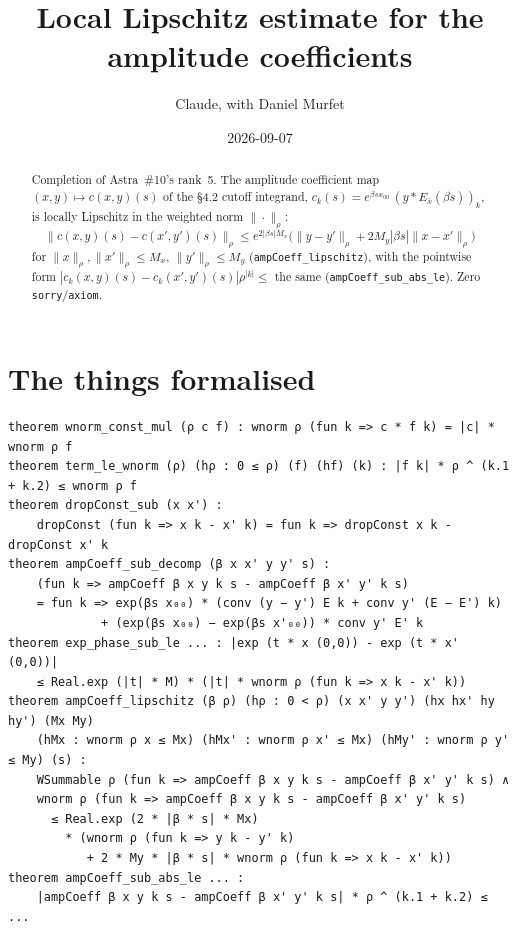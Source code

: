 \documentclass[11pt]{article}
\title{Local Lipschitz estimate for the amplitude coefficients}
\author{Claude, with Daniel Murfet}
\date{2026-09-07}
\begin{document}
\maketitle
\sloppy

\begin{abstract}
Completion of Astra~\#10's rank~5. The amplitude coefficient map $(x,y)\mapsto c(x,y)(s)$ of the
§4.2 cutoff integrand, $c_k(s)=e^{\beta s x_{00}}\,(y*E_{\bar x}(\beta s))_k$, is locally Lipschitz
in the weighted norm $\|\cdot\|_\rho$:
\[
\|c(x,y)(s)-c(x',y')(s)\|_\rho\le e^{2|\beta s|M_x}\big(\|y-y'\|_\rho+2M_y|\beta s|\|x-x'\|_\rho\big)
\]
for $\|x\|_\rho,\|x'\|_\rho\le M_x$, $\|y'\|_\rho\le M_y$ (\texttt{ampCoeff\_lipschitz}), with the
pointwise form $|c_k(x,y)(s)-c_k(x',y')(s)|\rho^{|k|}\le$ the same
(\texttt{ampCoeff\_sub\_abs\_le}). Zero \texttt{sorry}/\texttt{axiom}.
\end{abstract}

\section{The things formalised}
{\small
\begin{verbatim}
theorem wnorm_const_mul (ρ c f) : wnorm ρ (fun k => c * f k) = |c| * wnorm ρ f
theorem term_le_wnorm (ρ) (hρ : 0 ≤ ρ) (f) (hf) (k) : |f k| * ρ ^ (k.1 + k.2) ≤ wnorm ρ f
theorem dropConst_sub (x x') :
    dropConst (fun k => x k - x' k) = fun k => dropConst x k - dropConst x' k
theorem ampCoeff_sub_decomp (β x x' y y' s) :
    (fun k => ampCoeff β x y k s - ampCoeff β x' y' k s)
    = fun k => exp(βs x₀₀) * (conv (y − y') E k + conv y' (E − E') k)
             + (exp(βs x₀₀) − exp(βs x'₀₀)) * conv y' E' k
theorem exp_phase_sub_le ... : |exp (t * x (0,0)) - exp (t * x' (0,0))|
    ≤ Real.exp (|t| * M) * (|t| * wnorm ρ (fun k => x k - x' k))
theorem ampCoeff_lipschitz (β ρ) (hρ : 0 < ρ) (x x' y y') (hx hx' hy hy') (Mx My)
    (hMx : wnorm ρ x ≤ Mx) (hMx' : wnorm ρ x' ≤ Mx) (hMy' : wnorm ρ y' ≤ My) (s) :
    WSummable ρ (fun k => ampCoeff β x y k s - ampCoeff β x' y' k s) ∧
    wnorm ρ (fun k => ampCoeff β x y k s - ampCoeff β x' y' k s)
      ≤ Real.exp (2 * |β * s| * Mx)
        * (wnorm ρ (fun k => y k - y' k)
           + 2 * My * |β * s| * wnorm ρ (fun k => x k - x' k))
theorem ampCoeff_sub_abs_le ... :
    |ampCoeff β x y k s - ampCoeff β x' y' k s| * ρ ^ (k.1 + k.2) ≤ ...
\end{verbatim}
}
\end{document}
